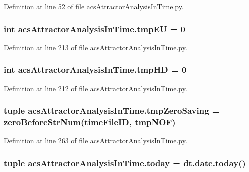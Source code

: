 Definition at line 52 of file acs\-Attractor\-Analysis\-In\-Time.\-py.

\hypertarget{a00091_a9019a56cfd992899ffc519204307a8ae}{
\subsubsection[{tmp\-E\-U}]{\setlength{\rightskip}{0pt plus 5cm}int acs\-Attractor\-Analysis\-In\-Time.\-tmp\-E\-U = 0}}\label{a00091_a9019a56cfd992899ffc519204307a8ae}


Definition at line 213 of file acs\-Attractor\-Analysis\-In\-Time.\-py.

\hypertarget{a00091_a35b7af9eb7cd962d33c5d56eae794c7b}{
\subsubsection[{tmp\-H\-D}]{\setlength{\rightskip}{0pt plus 5cm}int acs\-Attractor\-Analysis\-In\-Time.\-tmp\-H\-D = 0}}\label{a00091_a35b7af9eb7cd962d33c5d56eae794c7b}


Definition at line 212 of file acs\-Attractor\-Analysis\-In\-Time.\-py.

\hypertarget{a00091_ae86fc9dc3283934244ec28446445f722}{
\subsubsection[{tmp\-Zero\-Saving}]{\setlength{\rightskip}{0pt plus 5cm}tuple acs\-Attractor\-Analysis\-In\-Time.\-tmp\-Zero\-Saving = {\bf zero\-Before\-Str\-Num}(time\-File\-I\-D, tmp\-N\-O\-F)}}\label{a00091_ae86fc9dc3283934244ec28446445f722}


Definition at line 263 of file acs\-Attractor\-Analysis\-In\-Time.\-py.

\hypertarget{a00091_af30cd903eabfe4c9167f2a5d0062a4ce}{
\subsubsection[{today}]{\setlength{\rightskip}{0pt plus 5cm}tuple acs\-Attractor\-Analysis\-In\-Time.\-today = dt.\-date.\-today()}}\label{a00091_af30cd903eabfe4c9167f2a5d0062a4ce}


